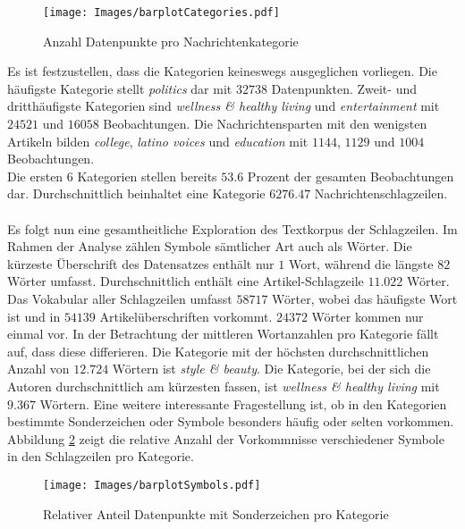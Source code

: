 \documentclass[a4paper,11pt]{article}
\begin{document}
\begin{figure}[ht]
    \centering
\texttt{[image: Images/barplotCategories.pdf]} 
\caption{Anzahl Datenpunkte pro Nachrichtenkategorie}
\label{abb:barplotCategories}
\end{figure}

Es ist festzustellen, dass die Kategorien keineswegs ausgeglichen vorliegen. Die häufigste Kategorie stellt \textit{politics} dar mit $32738$ Datenpunkten. Zweit- und dritthäufigste Kategorien sind \textit{wellness \& healthy living} und \textit{entertainment} mit $24521$ und $16058$ Beobachtungen. Die Nachrichtensparten mit den wenigsten Artikeln bilden \textit{college}, \textit{latino voices} und \textit{education} mit $1144$, $1129$ und $1004$ Beobachtungen.\\
Die ersten $6$ Kategorien stellen bereits $53.6$ Prozent der gesamten Beobachtungen dar. Durchschnittlich beinhaltet eine Kategorie $6276.47$ Nachrichtenschlagzeilen.\\
\\
Es folgt nun eine gesamtheitliche Exploration des Textkorpus der Schlagzeilen. Im Rahmen der Analyse zählen Symbole sämtlicher Art auch als Wörter. Die kürzeste Überschrift des Datensatzes enthält nur $1$ Wort, während die längste $82$ Wörter umfasst. Durchschnittlich enthält eine Artikel-Schlagzeile $11.022$ Wörter. Das Vokabular aller Schlagzeilen umfasst $58717$ Wörter, wobei  das häufigste Wort ist und in $54139$ Artikelüberschriften vorkommt. $24372$ Wörter kommen nur einmal vor. In der Betrachtung der mittleren Wortanzahlen pro Kategorie fällt auf, dass diese differieren. Die Kategorie mit der höchsten durchschnittlichen Anzahl von $12.724$ Wörtern ist \textit{style \& beauty}. Die Kategorie, bei der sich die Autoren durchschnittlich am kürzesten fassen, ist \textit{wellness \& healthy living} mit $9.367$ Wörtern. Eine weitere interessante Fragestellung ist, ob in den Kategorien bestimmte Sonderzeichen oder Symbole besonders häufig oder selten vorkommen. Abbildung \ref{abb:barplotSymbols} zeigt die relative Anzahl der Vorkommnisse verschiedener Symbole in den Schlagzeilen pro Kategorie.

\begin{figure}[ht]
    \centering
\texttt{[image: Images/barplotSymbols.pdf]} 
\caption{Relativer Anteil Datenpunkte mit Sonderzeichen pro Kategorie}
\label{abb:barplotSymbols}
\end{figure}
\end{document}
